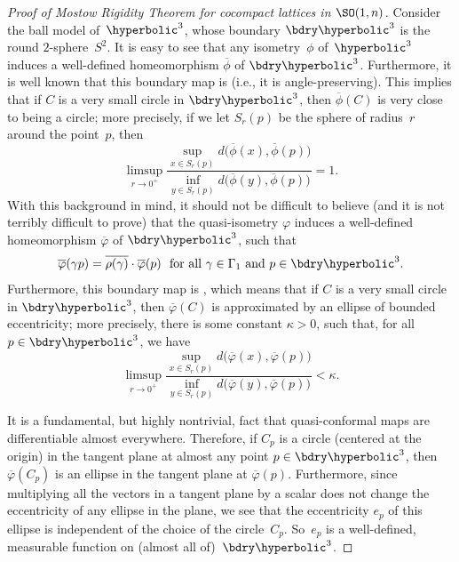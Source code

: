 \begin{proof}[Proof  of Mostow Rigidity Theorem for cocompact lattices in $\SO(1,n)$]
Consider the ball model of~$\hyperbolic^3$, whose boundary $\bdry \hyperbolic^3$ is the round $2$-sphere~$S^2$. It is easy to see that any isometry~$\phi$ of~$\hyperbolic^3$ induces a well-defined homeomorphism $\overline\phi$ of $\bdry \hyperbolic^3$. 
Furthermore, it is well known that this boundary map is  (i.e., it is angle-preserving). This implies that if $C$ is a very small circle in $\bdry \hyperbolic^3$, then $\overline\phi(C)$ is very close to being a circle; more precisely, if we let $S_r(p)$ be the sphere of radius~$r$ around the point~$p$, then
	$$ \limsup_{r \to 0^+} \frac{\sup_{x \in S_r(p)} d \bigl( \overline\phi(x), \overline\phi(p) \bigr)}{\inf_{y \in S_r(p)} d \bigl( \overline\phi(y), \overline\phi(p) \bigr)}
	= 1 .$$
With this background in mind, it should not be difficult to believe (and it is not terribly difficult to prove) that the quasi-isometry $\varphi$ induces a well-defined homeomorphism $\overline\varphi$ of $\bdry \hyperbolic^3$, such that 
	\begin{align} \label{MostowPfSO13OverlineVarphi}
	\text{$\overline\varphi(\gamma p) = \overline{\rho(\gamma)} \cdot \overline\varphi(p)$ 
	\ for all $\gamma \in \Gamma_1$ and $p \in \bdry\hyperbolic^3$} 
	. \end{align}
Furthermore, this boundary map is , which means that if $C$ is a very small circle in $\bdry \hyperbolic^3$, then $\overline\varphi(C)$ is approximated by an ellipse of bounded eccentricity; more precisely, there is some constant $\kappa > 0$, such that, for all $p \in \bdry \hyperbolic^3$, we have
	$$ \limsup_{r \to 0^+} \frac{\sup_{x \in S_r(p)} d \bigl( \overline\varphi(x), \overline\varphi(p) \bigr)}{\inf_{y \in S_r(p)} d \bigl( \overline\varphi(y), \overline\varphi(p) \bigr)}
	< \kappa .$$ 

It is a fundamental, but highly nontrivial, fact that quasi-conformal maps are differentiable almost everywhere. Therefore, if $C_p$ is a circle (centered at the origin) in the tangent plane at almost any point $p \in \bdry\hyperbolic^3$, then $\overline\varphi(C_p)$ is an ellipse in the tangent plane at $\overline\varphi(p)$. Furthermore, since multiplying all the vectors in a tangent plane by a scalar does not change the eccentricity of any ellipse in the plane, we see that the eccentricity $e_p$ of this ellipse is independent of the choice of the circle~$C_p$. So~$e_p$ is a well-defined, measurable function on (almost all of)~$\bdry\hyperbolic^3$.

\setcounter{case}{0}


\end{proof}
